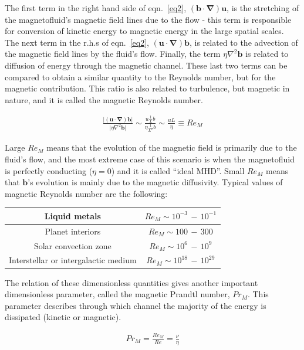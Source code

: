 \documentclass[a4paper,12pt]{article}
\begin{document}
The first term in the right hand side of eqn.~\ref{eq2}, $(\bm b \cdot \bm \nabla)\bm u$, is the stretching of the magnetofluid's magnetic field lines due to the flow - this term is responsible for conversion of kinetic energy to magnetic energy in the large spatial scales. The next term in the r.h.s of eqn.~\ref{eq2}, $(\bm u \cdot \bm \nabla)\bm b$, is related to the advection of the magnetic field lines by the fluid's flow. Finally, the term $\eta \nabla^2 \bm b$ is related to diffusion of energy through the magnetic channel. These last two terms can be compared to obtain a similar quantity to the Reynolds number, but for the magnetic contribution. This ratio is also related to turbulence, but magnetic in nature, and it is called the magnetic Reynolds number. 

\begin{align}
 \frac{\vert (\bm u \cdot \bm \nabla) \bm b \vert}{\vert \eta \nabla^2 \bm b \vert} \sim \frac{u \frac{1}{L} b}{\eta \frac{1}{L^2} b} \sim \frac{u L}{\eta} \equiv Re_M \nonumber
\end{align}

Large $Re_M$ means that the evolution of the magnetic field is primarily due to the fluid's flow, and the most extreme case of this scenario is when the magnetofluid is perfectly conducting ($\eta = 0$) and it is called ``ideal MHD''. Small $Re_M$ means that $\bm b$'s evolution is mainly due to the magnetic diffusivity. Typical values of magnetic Reynolds number are the following:

\begin{center}
\begin{tabular}{| c | c |}
 \hline
 Liquid metals & $Re_M \sim 10^{-3}\,-\,10^{-1}$ \\ 
 \hline
 Planet interiors & $Re_M \sim 100\,-\,300$ \\ 
 \hline
 Solar convection zone & $Re_M \sim 10^{6}\,-\,10^{9}$ \\ 
 \hline
 Interstellar or intergalactic medium & $Re_M \sim 10^{18}\,-\,10^{29}$ \\ 
 \hline
\end{tabular}
\end{center}

The relation of these dimensionless quantities gives another important dimensionless parameter, called the magnetic Prandtl number, $Pr_M$. This parameter describes through which channel the majority of the energy is dissipated (kinetic or magnetic).

\begin{align}
 Pr_M = \frac{Re_M}{Re} = \frac{\nu}{\eta} \nonumber
\end{align}
\end{document}
